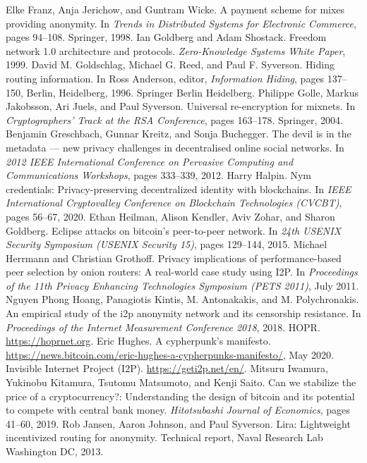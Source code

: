 \documentclass{article}
\begin{document}
\begin{thebibliography}{200}
Elke Franz, Anja Jerichow, and Guntram Wicke. A payment scheme for mixes providing anonymity. In \emph{Trends in Distributed Systems for Electronic Commerce}, pages 94–108. Springer, 1998.
Ian Goldberg and Adam Shostack. Freedom network 1.0 architecture and protocols. \emph{Zero-Knowledge Systems White Paper}, 1999.
David M. Goldschlag, Michael G. Reed, and Paul F. Syverson. Hiding routing information. In Ross Anderson, editor, \emph{Information Hiding}, pages 137–150, Berlin, Heidelberg, 1996. Springer Berlin Heidelberg.
Philippe Golle, Markus Jakobsson, Ari Juels, and Paul Syverson. Universal re-encryption for mixnets. In \emph{Cryptographers’ Track at the RSA Conference}, pages 163–178. Springer, 2004.
Benjamin Greschbach, Gunnar Kreitz, and Sonja Buchegger. The devil is in the metadata — new privacy challenges in decentralised online social networks. In \emph{2012 IEEE International Conference on Pervasive Computing and Communications Workshops}, pages 333–339, 2012.
Harry Halpin. Nym credentials: Privacy-preserving decentralized identity with blockchains. In \emph{IEEE International Cryptovalley Conference on Blockchain Technologies (CVCBT)}, pages 56–67, 2020.
Ethan Heilman, Alison Kendler, Aviv Zohar, and Sharon Goldberg. Eclipse attacks on bitcoin’s peer-to-peer network. In \emph{24th USENIX Security Symposium (USENIX Security 15)}, pages 129–144, 2015.
Michael Herrmann and Christian Grothoff. Privacy implications of performance-based peer selection by onion routers: A real-world case study using I2P. In \emph{Proceedings of the 11th Privacy Enhancing Technologies Symposium (PETS 2011)}, July 2011.
Nguyen Phong Hoang, Panagiotis Kintis, M. Antonakakis, and M. Polychronakis. An empirical study of the i2p anonymity network and its censorship resistance. In \emph{Proceedings of the Internet Measurement Conference 2018}, 2018.
HOPR. \url{https://hoprnet.org}.
Eric Hughes. A cypherpunk's manifesto. \url{https://news.bitcoin.com/eric-hughes-a-cypherpunks-manifesto/}, May 2020.
Invisible Internet Project (I2P). \url{https://geti2p.net/en/}.
Mitsuru Iwamura, Yukinobu Kitamura, Tsutomu Matsumoto, and Kenji Saito. Can we stabilize the price of a cryptocurrency?: Understanding the design of bitcoin and its potential to compete with central bank money. \emph{Hitotsubashi Journal of Economics}, pages 41–60, 2019.
Rob Jansen, Aaron Johnson, and Paul Syverson. Lira: Lightweight incentivized routing for anonymity. Technical report, Naval Research Lab Washington DC, 2013.

\end{thebibliography}
\end{document}
